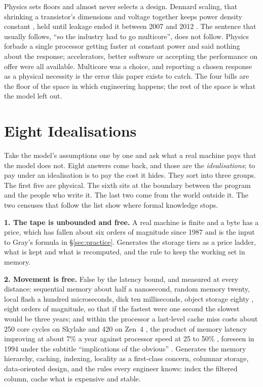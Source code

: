 \documentclass[11pt,oneside]{article}
\theoremstyle{definition}
\theoremstyle{remark}
\begin{document}
Physics sets floors and almost never selects a design. Dennard scaling, that shrinking a
transistor's dimensions and voltage together keeps power density constant
\cite{dennard1974}, held until leakage ended it between 2007 and 2012 \cite{hennessy2019}.
The sentence that usually follows, ``so the industry had to go multicore'', does not
follow. Physics forbade a single processor getting faster at constant power and said
nothing about the response; accelerators, better software or accepting the performance on
offer were all available. Multicore was a choice, and reporting a chosen response as a
physical necessity is the error this paper exists to catch. The four bills are the floor
of the space in which engineering happens; the rest of the space is what the model left
out.

\section{Eight Idealisations}\label{sec:idealisations}
Take the model's assumptions one by one and ask what a real machine pays that the model
does not. Eight answers come back, and those are the \emph{idealisations}; to pay under
an idealisation is to pay the cost it hides. They sort into three groups. The first five
are physical. The sixth sits at the boundary between the program and the people who write
it. The last two come from the world outside it. The two censuses that follow the list
show where formal knowledge stops.

\textbf{1. The tape is unbounded and free.} A real machine is finite and a byte has a
price, which has fallen about six orders of magnitude since 1987 and is the input to
Gray's formula in \S\ref{sec:practice}. Generates the storage tiers as a price ladder,
what is kept and what is recomputed, and the rule to keep the working set in memory.

\textbf{2. Movement is free.} False by the latency bound, and measured at every distance:
sequential memory about half a nanosecond, random memory twenty, local flash a hundred
microseconds, disk ten milliseconds, object storage eighty \cite{napkinmath}, eight orders
of magnitude, so that if the fastest were one second the slowest would be three years;
and within the processor a last-level cache miss costs about 250 core cycles on Skylake
and 420 on Zen~4 \cite{sevencpu,chipsandcheese}, the product of memory latency improving at
about 7\% a year against processor speed at 25 to 50\% \cite{hennessy2019}, foreseen in
1994 under the subtitle ``implications of the obvious'' \cite{wulf1995}. Generates the
memory hierarchy, caching, indexing, locality as a first-class concern, columnar storage,
data-oriented design, and the rules every engineer knows: index the filtered column, cache
what is expensive and stable.
\end{document}
